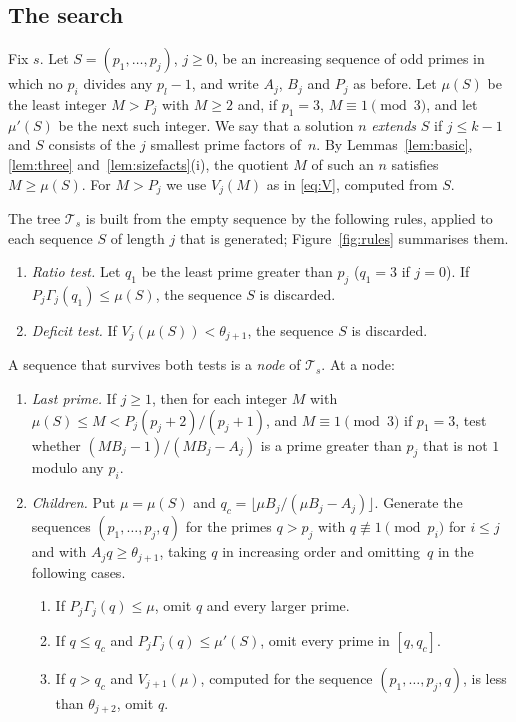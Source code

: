 \documentclass[11pt,reqno]{amsart}
\numberwithin{equation}{section}
\theoremstyle{plain}
\theoremstyle{definition}
\theoremstyle{remark}
\begin{document}
\subsection{The search}\label{sec:sizesearch}
Fix $s$. Let $S=(p_1,\dots,p_j)$, $j\ge0$, be an increasing sequence
of odd primes in which no $p_i$ divides any $p_l-1$, and write $A_j$,
$B_j$ and $P_j$ as before. Let $\mu(S)$ be the least integer $M>P_j$
with $M\ge2$ and, if $p_1=3$, $M\equiv1\pmod3$, and let $\mu'(S)$ be
the next such integer. We say that a solution $n$ \emph{extends} $S$
if $j\le k-1$ and $S$ consists of the $j$ smallest prime factors
of~$n$. By Lemmas~\ref{lem:basic}, \ref{lem:three}
and~\ref{lem:sizefacts}(i), the quotient $M$ of such an $n$ satisfies
$M\ge\mu(S)$. For $M>P_j$ we use $V_j(M)$ as in \eqref{eq:V},
computed from $S$.

The tree $\mathcal T_s$ is built from the empty sequence by the
following rules, applied to each sequence $S$ of length $j$ that is
generated; Figure~\ref{fig:rules} summarises them.

\begin{enumerate}[label=\textup{(R\arabic*)},leftmargin=*]
\item\label{r:ratio} \emph{Ratio test.} Let $q_1$ be the least prime
greater than $p_j$ ($q_1=3$ if $j=0$). If $P_j\Gamma_j(q_1)\le\mu(S)$,
the sequence $S$ is discarded.
\item\label{r:deficit} \emph{Deficit test.} If
$V_j(\mu(S))<\theta_{j+1}$, the sequence $S$ is discarded.
\end{enumerate}
A sequence that survives both tests is a \emph{node} of
$\mathcal T_s$. At a node:
\begin{enumerate}[label=\textup{(R\arabic*)},leftmargin=*,resume]
\item\label{r:last} \emph{Last prime.} If $j\ge1$, then for each
integer $M$ with $\mu(S)\le M<P_j(p_j+2)/(p_j+1)$, and
$M\equiv1\pmod3$ if $p_1=3$, test whether
$(MB_j-1)/(MB_j-A_j)$ is a prime greater than $p_j$ that is not $1$
modulo any $p_i$.
\item\label{r:children} \emph{Children.} Put $\mu=\mu(S)$ and
$q_c=\lfloor\mu B_j/(\mu B_j-A_j)\rfloor$. Generate the sequences
$(p_1,\dots,p_j,q)$ for the primes $q>p_j$ with
$q\not\equiv1\pmod{p_i}$ for $i\le j$ and with $A_jq\ge\theta_{j+1}$,
taking $q$ in increasing order and omitting~$q$ in the following
cases.
\begin{enumerate}[label=(\roman*)]
\item If $P_j\Gamma_j(q)\le\mu$, omit $q$ and every larger prime.
\item If $q\le q_c$ and $P_j\Gamma_j(q)\le\mu'(S)$, omit every prime
in $[q,q_c]$.
\item If $q>q_c$ and $V_{j+1}(\mu)$, computed for the sequence
$(p_1,\dots,p_j,q)$, is less than $\theta_{j+2}$, omit $q$.
\end{enumerate}
\end{enumerate}
\end{document}
